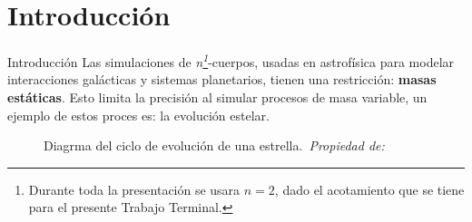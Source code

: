 \section{Introducción}

\begin{frame}{Introducción}
    \vspace{-0.15cm}
    {\fontsize{8pt}{10pt}\selectfont
    Las simulaciones de \textit{n\footnote{\tiny Durante toda la presentación se usara $n = 2$, dado el acotamiento que se tiene para el presente Trabajo Terminal.}}-cuerpos, usadas en astrofísica para modelar interacciones galácticas y sistemas planetarios, tienen una restricción: \textbf{masas estáticas}. Esto limita la precisión al simular procesos de masa variable, un ejemplo de estos proces es: la evolución estelar.
    }
    \vspace{0cm}
    \begin{figure}[H]
        \centering
        \vspace{-0.25cm}
        \caption{\tiny Diagrma del ciclo de evolución de una estrella.~\textit{Propiedad de: }~\cite{smartyprints_constellation_poster_2025}}%
        \label{fig:star-constellation-map}
    \end{figure}
\end{frame}

